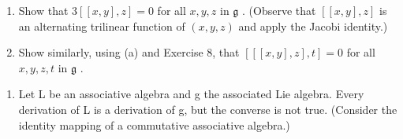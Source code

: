 \begin{enumerate}
\def\labelenumi{(\alph{enumi})}
\item
  Show that \(3[[x,y],z] = 0\) for all \(x,y,z\) in \(\mathfrak{g}\) . (Observe that \([[x,y],z]\) is an alternating trilinear function of \((x,y,z)\) and apply the Jacobi identity.)
\item
  Show similarly, using (a) and Exercise 8, that \(\left[[[x,y],z],t\right]=0\) for all \(x,y,z,t\) in \(\mathfrak{g}\) .
\end{enumerate}

\begin{enumerate}
\def\labelenumi{\arabic{enumi}.}
\setcounter{enumi}{9}
\tightlist
\item
  Let L be an associative algebra and g the associated Lie algebra. Every derivation of L is a derivation of g, but the converse is not true. (Consider the identity mapping of a commutative associative algebra.)
\end{enumerate}
